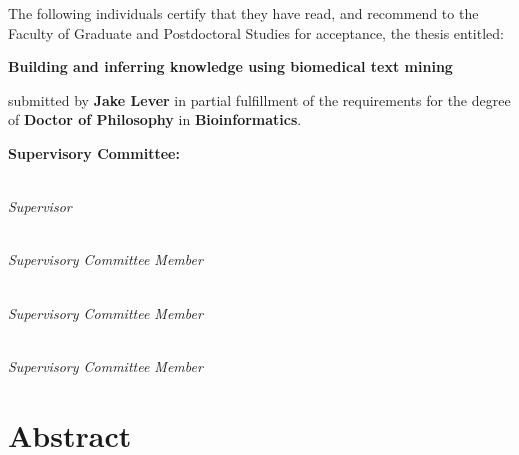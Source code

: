 
\noindent The following individuals certify that they have read,
and recommend to the Faculty of Graduate and Postdoctoral Studies
for acceptance, the thesis entitled:

\begin{center}
{\large \textbf{Building and inferring knowledge using biomedical text mining}}
\end{center}

submitted by \textbf{Jake Lever} in partial fulfillment of the requirements for the degree of \textbf{Doctor of Philosophy} in \textbf{Bioinformatics}.%
\par\bigskip%
\noindent\textbf{Supervisory Committee:}%
\par\medskip{}\\\emph{Supervisor}
\par\medskip{}\\\emph{Supervisory Committee Member}
\par\medskip{}\\\emph{Supervisory Committee Member}
\par\medskip{}\\\emph{Supervisory Committee Member}
\cleardoublepage

\chapter{Abstract}

